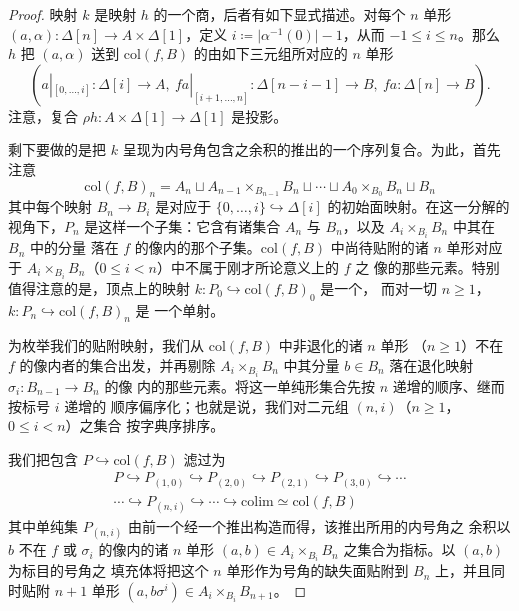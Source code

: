 \begin{proof}
映射 $k$ 是映射 $h$ 的一个商，后者有如下显式描述。对每个 $n$ 单形
$(a,\alpha)\colon\Delta[n]\to A\times\Delta[1]$，定义
$i\coloneqq\lvert\alpha^{-1}(0)\rvert-1$，从而 $-1\le i\le n$。那么 $h$ 把
$(a,\alpha)$ 送到 $\mathrm{col}(f,B)$ 的由如下三元组所对应的 $n$ 单形
\[
(a|_{[0,\dotsc,i]}\colon\Delta[i]\to A,\ fa|_{[i+1,\dotsc,n]}\colon\Delta[n-i-1]\to B,\ fa\colon\Delta[n]\to B).
\]
注意，复合 $\rho h\colon A\times\Delta[1]\to\Delta[1]$ 是投影。

剩下要做的是把 $k$ 呈现为内号角包含之余积的推出的一个序列复合。为此，首先
注意
\[
\mathrm{col}(f,B)_{n}=A_{n}\sqcup A_{n-1}\times_{B_{n-1}}B_{n}\sqcup\dotsb\sqcup A_{0}\times_{B_{0}}B_{n}\sqcup B_{n}
\]
其中每个映射 $B_{n}\to B_{i}$ 是对应于 $\{0,\dotsc,i\}\hookrightarrow\Delta[i]$
的初始面映射。在这一分解的视角下，$P_{n}$ 是这样一个子集：它含有诸集合
$A_{n}$ 与 $B_{n}$，以及 $A_{i}\times_{B_{i}}B_{n}$ 中其在 $B_{n}$ 中的分量
落在 $f$ 的像内的那个子集。$\mathrm{col}(f,B)$ 中尚待贴附的诸 $n$ 单形对应
于 $A_{i}\times_{B_{i}}B_{n}$（$0\le i<n$）中不属于刚才所论意义上的 $f$ 之
像的那些元素。特别值得注意的是，顶点上的映射
$k\colon P_{0}\hookrightarrow\mathrm{col}(f,B)_{0}$ 是一个\trIsomorphism，
而对一切 $n\ge 1$，$k\colon P_{n}\hookrightarrow\mathrm{col}(f,B)_{n}$ 是
一个单射。

为枚举我们的贴附映射，我们从 $\mathrm{col}(f,B)$ 中非退化的诸 $n$ 单形
（$n\ge 1$）不在 $f$ 的像内者的集合出发，并再剔除 $A_{i}\times_{B_{i}}B_{n}$
中其分量 $b\in B_{n}$ 落在退化映射 $\sigma_{i}\colon B_{n-1}\to B_{n}$ 的像
内的那些元素。将这一单纯形集合先按 $n$ 递增的顺序、继而按标号 $i$ 递增的
顺序偏序化；也就是说，我们对二元组 $(n,i)$（$n\ge 1$，$0\le i<n$）之集合
按字典序排序。

我们把包含 $P\hookrightarrow\mathrm{col}(f,B)$ 滤过为
\[
\begin{gathered}
P\hookrightarrow P_{(1,0)}\hookrightarrow P_{(2,0)}\hookrightarrow P_{(2,1)}\hookrightarrow P_{(3,0)}\hookrightarrow\dotsb\\
\dotsb\hookrightarrow P_{(n,i)}\hookrightarrow\dotsb\hookrightarrow\mathrm{colim}\simeq\mathrm{col}(f,B)
\end{gathered}
\]
其中单纯集 $P_{(n,i)}$ 由前一个经一个推出构造而得，该推出所用的内号角之
余积以 $b$ 不在 $f$ 或 $\sigma_{i}$ 的像内的诸 $n$ 单形
$(a,b)\in A_{i}\times_{B_{i}}B_{n}$ 之集合为指标。以 $(a,b)$ 为标目的号角之
填充体将把这个 $n$ 单形作为号角的缺失面贴附到 $B_{n}$ 上，并且同时贴附
$n+1$ 单形 $(a,b\sigma^{i})\in A_{i}\times_{B_{i}}B_{n+1}$。


\end{proof}
